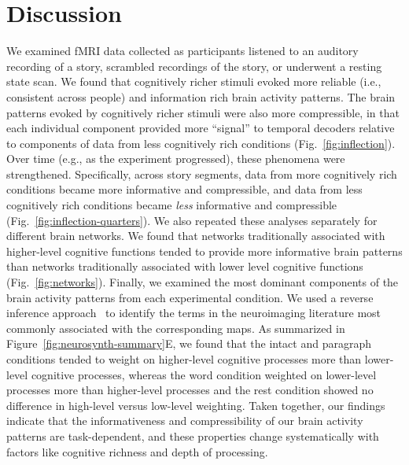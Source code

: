 \documentclass[english, 11pt]{article}
\begin{document}
\section*{Discussion}

We examined fMRI data collected as participants listened to an auditory
recording of a story, scrambled recordings of the story, or underwent a resting
state scan. We found that cognitively richer stimuli evoked more reliable
(i.e., consistent across people) and information rich brain activity patterns.
The brain patterns evoked by cognitively richer stimuli were also more
compressible, in that each individual component provided more ``signal'' to
temporal decoders relative to components of data from less cognitively rich
conditions (Fig.~\ref{fig:inflection}). Over time (e.g., as the experiment
progressed), these phenomena were strengthened. Specifically, across story
segments, data from more cognitively rich conditions became more informative
and compressible, and data from less cognitively rich conditions became
\textit{less} informative and compressible
(Fig.~\ref{fig:inflection-quarters}).  We also repeated these analyses
separately for different brain networks. We found that networks traditionally
associated with higher-level cognitive functions tended to provide more
informative brain patterns than networks traditionally associated with lower
level cognitive functions (Fig.~\ref{fig:networks}). Finally, we examined the
most dominant components of the brain activity patterns from each experimental
condition. We used a reverse inference approach~\citep{RubiEtal17} to identify
the terms in the neuroimaging literature most commonly associated with the
corresponding maps. As summarized in Figure~\ref{fig:neurosynth-summary}E, we
found that the intact and paragraph conditions tended to weight on higher-level
cognitive processes more than lower-level cognitive processes, whereas the word
condition weighted on lower-level processes more than higher-level processes
and the rest condition showed no difference in high-level versus low-level
weighting. Taken together, our findings indicate that the informativeness and
compressibility of our brain activity patterns are task-dependent, and these
properties change systematically with factors like cognitive richness and depth
of processing.
\end{document}
